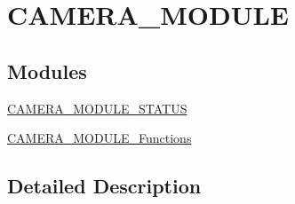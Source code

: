 \hypertarget{group___c_a_m_e_r_a___m_o_d_u_l_e}{}\section{C\+A\+M\+E\+R\+A\+\_\+\+M\+O\+D\+U\+LE}
\label{group___c_a_m_e_r_a___m_o_d_u_l_e}
\subsection*{Modules}
\begin{DoxyCompactItemize}
\item 
\hyperlink{group___c_a_m_e_r_a___m_o_d_u_l_e___s_t_a_t_u_s}{C\+A\+M\+E\+R\+A\+\_\+\+M\+O\+D\+U\+L\+E\+\_\+\+S\+T\+A\+T\+US}
\item 
\hyperlink{group___c_a_m_e_r_a___m_o_d_u_l_e___functions}{C\+A\+M\+E\+R\+A\+\_\+\+M\+O\+D\+U\+L\+E\+\_\+\+Functions}
\end{DoxyCompactItemize}


\subsection{Detailed Description}
